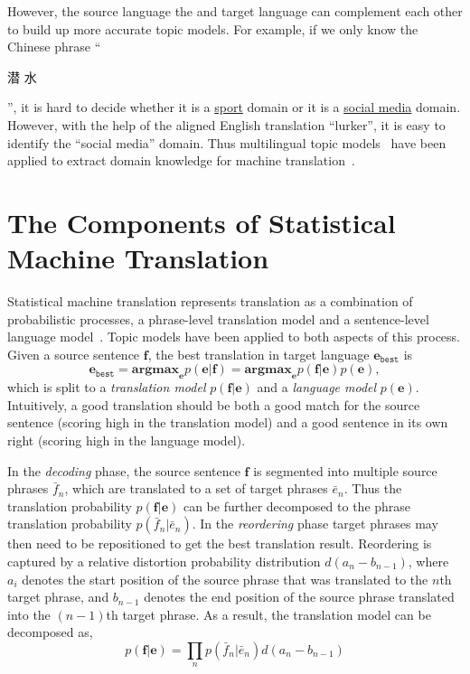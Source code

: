 However, the source language the and target language can complement
each other to build up more accurate topic models. For example, if we
only know the Chinese phrase ``\begin{CJK*}{UTF8}{gbsn}潜
  水\end{CJK*}'', it is hard to decide whether it is a
  \underline{sport} domain or it is a \underline{social media}
  domain. However, with the help of the aligned English translation
  ``lurker'', it is easy to identify the ``social media'' domain. Thus
  multilingual topic models~\citep{ni-09,DeSmet-09,mimno-09,boyd-graber-10} have been
  applied to extract domain knowledge for machine
  translation~\citep{hu-14}.

\section{The Components of Statistical Machine Translation}

Statistical machine translation represents translation as a
combination of probabilistic processes, a phrase-level translation model and a sentence-level language model~\citep{koehn-03,koehn-09}. 
Topic models have been applied to both aspects of this process.
Given a source sentence $\mathbf{f}$, the best
translation in target language $\mathbf{e}_\texttt{best}$ is
\begin{equation}
\mathbf{e}_\texttt{best} = \textbf{argmax}_\mathbf{e} p(\mathbf{e}|\mathbf{f}) = \textbf{argmax}_\mathbf{e} p(\mathbf{f}|\mathbf{e}) p (\mathbf{e}),
\end{equation}
which is split to a \textit{translation model}
$p(\mathbf{f}|\mathbf{e})$ and a \textit{language model} $p
(\mathbf{e})$.
Intuitively, a good translation should be both a good match for the source sentence (scoring high in the translation model) and a good sentence in its own right (scoring high in the language model).

In the \textit{decoding} phase, the source sentence $\mathbf{f}$ is segmented into multiple source
phrases $\bar{f}_n$, which are translated to a set
of target phrases $\bar{e}_n$. Thus the translation probability
$p(\mathbf{f}|\mathbf{e})$ can be further decomposed to the phrase
translation probability $p(\bar{f}_n | \bar{e}_n)$.
In the \textit{reordering} phase target phrases may then need to be repositioned to get the best
translation result. Reordering is captured by a relative distortion
probability distribution $d(a_n - b_{n-1})$, where $a_i$ denotes the
start position of the source phrase that was translated to the $n$th
target phrase, and $b_{n-1}$ denotes the end position of the source
phrase translated into the $(n-1)$th target phrase. As a result, the
translation model can be decomposed as,
\begin{equation}
p(\mathbf{f}|\mathbf{e}) = \prod_{n} p(\bar{f}_n | \bar{e}_n) d(a_n - b_{n-1})
\end{equation}

